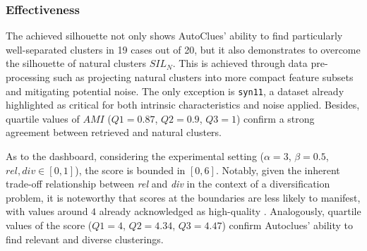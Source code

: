 \subsubsection{Effectiveness}\label{sssec:effectiveness}
The achieved silhouette not only shows AutoClues' ability to find particularly well-separated clusters in 19 cases out of 20, but it also demonstrates to overcome the silhouette of natural clusters $SIL_N$. 
This is achieved through data pre-processing such as projecting natural clusters into more compact feature subsets and mitigating potential noise.
The only exception is \texttt{syn11}, a dataset already highlighted as critical for both intrinsic characteristics and noise applied. 
Besides, quartile values of $AMI$ ($Q1=0.87$, $Q2=0.9$, $Q3=1$) confirm a strong agreement between retrieved and natural clusters. 

As to the dashboard, considering the experimental setting ($\alpha=3$, $\beta=0.5$,  $rel, div \in [0, 1]$), the score is bounded in $[0, 6]$.
Notably, given the inherent trade-off relationship between \textit{rel} and \textit{div} in the context of a diversification problem, it is noteworthy that scores at the boundaries are less likely to manifest,
with values around $4$ already acknowledged as high-quality \cite{vieira2011query}.
Analogously, quartile values of the score ($Q1=4$, $Q2=4.34$, $Q3=4.47$) confirm Autoclues' ability to find relevant and diverse clusterings.

